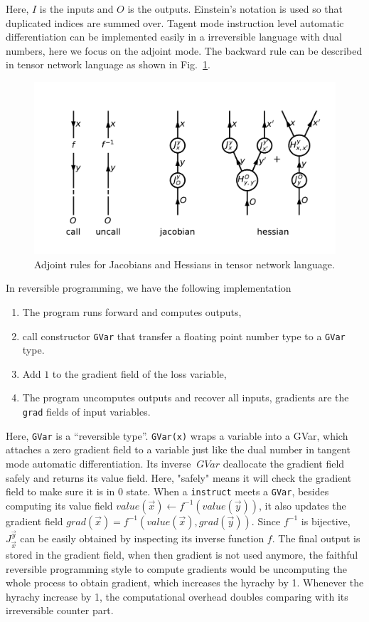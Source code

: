 \documentclass[aps,twocolumn,longbibliography,english,superscriptaddress,prr]{revtex4-1}
\newcommand{\<}{\langle}
\renewcommand{\>}{\rangle}
\newcommand{\out}{{O}}
\newcommand{\inp}{{I}}
\newcommand{\vx}{{\vec x}}
\newcommand{\vy}{{\vec y}}
\newcommand{\Fig}[1]{Fig.~\ref{#1}}
\theoremstyle{definition}\newtheorem{definition}{\textit{Definition}}
\begin{document}
Here, $\inp$ is the inputs and $\out$ is the outputs.
Einstein's notation is used so that duplicated indices are summed over.
Tagent mode instruction level automatic differentiation can be implemented easily in a irreversible language with dual numbers,
here we focus on the adjoint mode.
The backward rule can be described in tensor network language as shown in \Fig{fig:ad}.
\begin{figure}
    \centerline{\includegraphics[width=\columnwidth,trim={0 1cm 0 1cm},clip]{images/ad.pdf}}
    \caption{Adjoint rules for Jacobians and Hessians in tensor network language.}\label{fig:ad}
\end{figure}

In reversible programming, we have the following implementation
\begin{enumerate}
    \item The program runs forward and computes outputs,
    \item call constructor \texttt{GVar} that transfer a floating point number type to a \texttt{GVar} type.
    \item Add $1$ to the gradient field of the loss variable,
    \item The program uncomputes outputs and recover all inputs, gradients are the \texttt{grad} fields of input variables.
\end{enumerate}

Here, \texttt{GVar} is a ``reversible type''. \texttt{GVar(x)} wraps a variable into a GVar, which attaches a zero gradient field to a variable just like the dual number in tangent mode automatic differentiation. Its inverse $~GVar$ deallocate the gradient field safely and returns its value field. Here, "safely" means it will check the gradient field to make sure it is in $0$ state.
When a \texttt{instruct} meets a \texttt{GVar}, besides computing its value field $value(\vx) \leftarrow f^{-1}(value(\vy))$, it also updates the gradient field $grad(\vx) = f^{-1}(value(\vx), grad(\vy))$. Since $f^{-1}$ is bijective, $J^\vy_\vx$ can be easily obtained by inspecting its inverse function $f$.
The final output is stored in the gradient field, when then gradient is not used anymore, the faithful reversible programming style to compute gradients would be uncomputing the whole process to obtain gradient, which increases the hyrachy by 1. Whenever the hyrachy increase by 1, the computational overhead doubles comparing with its irreversible counter part.
\end{document}
